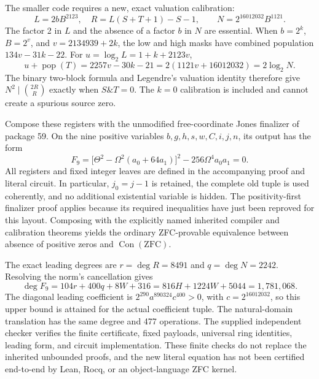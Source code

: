 The smaller code requires a new, exact valuation calibration:
\[
L=2bB^{2123},\quad R=L(S+T+1)-S-1,
\qquad N=2^{16012032}B^{1121}.
\]
The factor 2 in \(L\) and the absence of a factor \(b\) in \(N\) are
essential. When \(b=2^k\), \(B=2^v\), and \(v=2134939+2k\),
the low and high masks have combined population \(134v-31k-22\).
For \(u=\log_2L=1+k+2123v\),
\[
u+\operatorname{pop}(T)
=2257v-30k-21
=2(1121v+16012032)=2\log_2N.
\]
The binary two-block formula and Legendre's valuation identity therefore
give \(N^2\mid\binom{2R}{R}\) exactly when \(S\mathbin{\&}T=0\).
The \(k=0\) calibration is included and cannot create a spurious source zero.

Compose these registers with the unmodified free-coordinate Jones finalizer
of package 59. On the nine positive variables \(b,g,h,s,w,C,i,j,n\), its
output has the form
\[
\boxed{\ F_9=\bigl[\Theta^2-\Omega^2(a_0+64a_1)\bigr]^2
                   -256\Omega^4a_0a_1=0.\ }
\]
All registers and fixed integer leaves are defined in the accompanying proof
and literal circuit. In particular, \(j_0=j-1\) is retained, the complete
old tuple is used coherently, and no additional existential variable is hidden.
The positivity-first finalizer proof applies because its required inequalities
have just been reproved for this layout. Composing with the explicitly named
inherited compiler and calibration theorems yields the ordinary ZFC-provable
equivalence between absence of positive zeros and \(\operatorname{Con}(\mathrm{ZFC})\).

The exact leading degrees are \(r=\deg R=8491\) and
\(q=\deg N=2242\). Resolving the norm's cancellation gives
\[
\deg F_9=104r+400q+8W+316
=816H+1224W+5044=1{,}781{,}068.
\]
The diagonal leading coefficient is
\(2^{290}a^{890324}c^{400}>0\), with \(c=2^{16012032}\), so this
upper bound is attained for the actual coefficient tuple. The natural-domain
translation has the same degree and 477 operations. The supplied independent
checker verifies the finite certificate, fixed payloads, universal ring
identities, leading form, and circuit implementation. These finite checks do
not replace the inherited unbounded proofs, and the new literal equation has
not been certified end-to-end by Lean, Rocq, or an object-language ZFC kernel.
